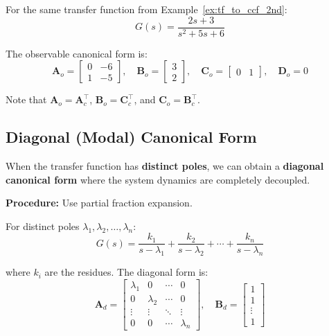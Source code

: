 \begin{example}
For the same transfer function from Example~\ref{ex:tf_to_ccf_2nd}:
\begin{equation}
G(s) = \frac{2s + 3}{s^2 + 5s + 6}
\end{equation}

The observable canonical form is:
\begin{equation}
\mathbf{A}_o = \begin{bmatrix} 0 & -6 \\ 1 & -5 \end{bmatrix}, \quad
\mathbf{B}_o = \begin{bmatrix} 3 \\ 2 \end{bmatrix}, \quad
\mathbf{C}_o = \begin{bmatrix} 0 & 1 \end{bmatrix}, \quad
\mathbf{D}_o = 0
\end{equation}

Note that $\mathbf{A}_o = \mathbf{A}_c^\top$, $\mathbf{B}_o = \mathbf{C}_c^\top$, and $\mathbf{C}_o = \mathbf{B}_c^\top$.
\end{example}

\subsection{Diagonal (Modal) Canonical Form}

When the transfer function has \textbf{distinct poles}, we can obtain a \textbf{diagonal canonical form} where the system dynamics are completely decoupled.

\textbf{Procedure:} Use partial fraction expansion.

For distinct poles $\lambda_1, \lambda_2, \ldots, \lambda_n$:
\begin{equation}
G(s) = \frac{k_1}{s - \lambda_1} + \frac{k_2}{s - \lambda_2} + \cdots + \frac{k_n}{s - \lambda_n}
\end{equation}

where $k_i$ are the residues. The diagonal form is:
\begin{equation}
\mathbf{A}_d = \begin{bmatrix}
\lambda_1 & 0 & \cdots & 0 \\
0 & \lambda_2 & \cdots & 0 \\
\vdots & \vdots & \ddots & \vdots \\
0 & 0 & \cdots & \lambda_n
\end{bmatrix}, \quad
\mathbf{B}_d = \begin{bmatrix} 1 \\ 1 \\ \vdots \\ 1 \end{bmatrix}
\label{eq:diagonal_AB}
\end{equation}


